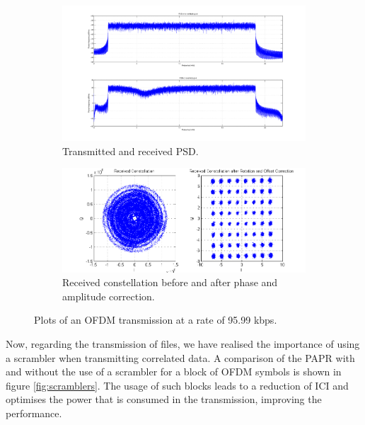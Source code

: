 \documentclass[12pt,a4paper,openright]{report}
\begin{document}
 \begin{figure}[H]
 \centering
\begin{subfigure}{1\textwidth}
 \centering
    \includegraphics[width=1\linewidth]{ofdm80kPSD.png}
    \caption{Transmitted and received PSD. }
    \label{fig:80psd}
\end{subfigure}%
 \quad
     \begin{subfigure}{0.9\textwidth}
 \centering
   \includegraphics[width=1\linewidth]{ofdm80kconst.png}
    \caption{Received constellation before and after phase and amplitude correction.}
    \label{fig:ofdm80const}
    \end{subfigure}
    \caption[Plots of an OFDM transmission at a rate of 95.99 kbps.]{Plots of an OFDM transmission at a rate of 95.99 kbps.}
    \label{ofdm80k}
\end{figure}

Now, regarding the transmission of files, we have realised the importance of using a scrambler when transmitting correlated data. A comparison of the PAPR with and without the use of a scrambler for a block of OFDM symbols is shown in figure \ref{fig:scramblers}. The usage of such blocks leads to a reduction of ICI and optimises the power that is consumed in the transmission, improving the performance.
\end{document}
